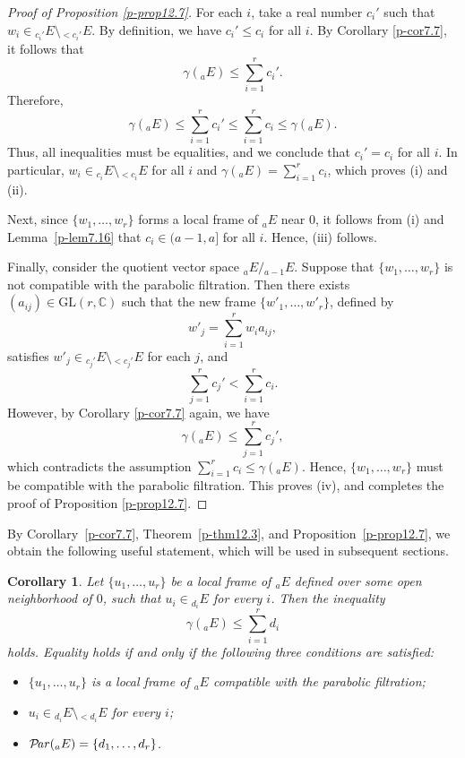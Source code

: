\documentclass[12pt,twoside]{amsart}
\DeclareMathOperator{\Par}{\mathcal{P}\!\it{ar}}
\newtheorem{cor}[thm]{Corollary}
\theoremstyle{definition}
\begin{document}
\begin{proof}[Proof of Proposition \ref{p-prop12.7}]
For each $i$, take a real number $c_i'$ such that 
$w_i \in {}_{c_i'}E \setminus {}_{<c_i'}E$. 
By definition, we have $c_i' \leq c_i$ for all $i$. 
By Corollary \ref{p-cor7.7}, it follows that
\[
\gamma({}_a E) \leq \sum_{i=1}^r c_i'.
\]
Therefore,
\[
\gamma({}_a E) \leq \sum_{i=1}^r c_i' \leq \sum_{i=1}^r c_i \leq \gamma({}_a E).
\]
Thus, all inequalities must be equalities, and 
we conclude that $c_i' = c_i$ for all $i$. 
In particular, $w_i \in {}_{c_i}E \setminus {}_{<c_i}E$ for all $i$ 
and $\gamma({}_a E)=\sum _{i=1}^r c_i$, which proves (i) and 
(ii).

Next, since $\{w_1, \ldots, w_r\}$ forms 
a local frame of ${}_a E$ near $0$, it follows from (i) and 
Lemma~\ref{p-lem7.16} that $c_i \in (a - 1, a]$ for all $i$. 
Hence, (iii) follows.

Finally, consider the quotient vector space ${}_aE / {}_{a-1}E$. 
Suppose that $\{w_1, \ldots, w_r\}$ is not compatible with the parabolic filtration. 
Then there exists $(a_{ij}) \in \mathrm{GL}(r, \mathbb{C})$ such that 
the new frame $\{w'_1, \ldots, w'_r\}$, defined by
\[
w'_j = \sum_{i=1}^r w_i a_{ij},
\]
satisfies $w'_j \in {}_{c_j'}E \setminus {}_{<c_j'}E$ for each $j$, and
\[
\sum_{j=1}^r c_j' < \sum_{i=1}^r c_i.
\]
However, by Corollary \ref{p-cor7.7} again, we have 
\[
\gamma({}_a E) \leq \sum_{j=1}^r c_j',
\]
which contradicts the assumption $\sum_{i=1}^r c_i \leq \gamma({}_a E)$. 
Hence, $\{w_1, \ldots, w_r\}$ must be compatible with the parabolic filtration. 
This proves (iv), and completes the proof of Proposition \ref{p-prop12.7}.
\end{proof}

By Corollary~\ref{p-cor7.7}, Theorem~\ref{p-thm12.3}, and  
Proposition~\ref{p-prop12.7}, we obtain the following useful statement,  
which will be used in subsequent sections.

\begin{cor}\label{p-cor12.8} 
Let $\{u_1, \ldots, u_r\}$ be a local frame of ${}_a E$ 
defined over some open neighborhood of $0$, such that  
$u_i \in {}_{d_i} E$ for every $i$.  
Then the inequality  
\[
\gamma({}_a E) \leq \sum_{i=1}^r d_i
\]
holds.  
Equality holds if and only if the following three conditions are satisfied:
\begin{itemize}
\item[(i)] $\{u_1, \ldots, u_r\}$ is a local 
frame of ${}_a E$ compatible with the parabolic filtration;
\item[(ii)] $u_i \in {}_{d_i} E \setminus {}_{<d_i} E$ for every $i$;
\item[(iii)] $\Par({}_a E) = \{d_1, \ldots, d_r\}$.
\end{itemize}
\end{cor}
\end{document}
